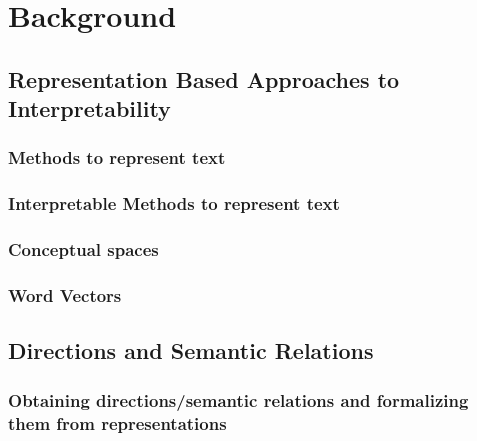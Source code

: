 \chapter{Background}
\section{Representation Based Approaches to Interpretability}
\subsection{Methods to represent text}
\subsection{Interpretable Methods to represent text}
\subsection{Conceptual spaces}
\subsection{Word Vectors}
\section{Directions and Semantic Relations}
\subsection{Obtaining directions/semantic relations and formalizing them from representations}
